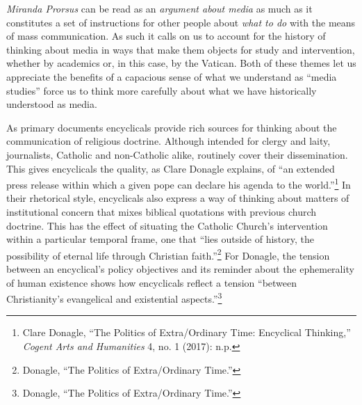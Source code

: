 \documentclass{tufte-handout}
\begin{document}
\noindent \emph{Miranda Prorsus} can be read as an
\emph{argument about media} as much as it constitutes a set of
instructions for other people about \emph{what to do} with the means of
mass communication. As such it calls on us to account for the history of
thinking about media in ways that make them objects for study and
intervention, whether by academics or, in this case, by the Vatican.
Both of these themes let us appreciate the benefits of a capacious sense
of what we understand as ``media studies'' force us to think more
carefully about what we have historically understood as media.

As primary documents encyclicals provide rich sources for thinking about
the communication of religious doctrine. Although intended for clergy
and laity, journalists, Catholic and non-Catholic alike, routinely cover
their dissemination. This gives encyclicals the quality, as Clare
Donagle explains, of ``an extended press release within which a given
pope can declare his agenda to the world.''\footnote{Clare Donagle,
  ``The Politics of Extra/Ordinary Time: Encyclical Thinking,''
  \emph{Cogent Arts and Humanities} 4, no. 1 (2017): n.p.} In their
rhetorical style, encyclicals also express a way of thinking about
matters of institutional concern that mixes biblical quotations with
previous church doctrine. This has the effect of situating the Catholic
Church's intervention within a particular temporal frame, one that
``lies outside of history, the possibility of eternal life through
Christian faith.''\footnote{Donagle, ``The Politics of Extra/Ordinary
  Time.''} For Donagle, the tension between an encyclical's policy
objectives and its reminder about the ephemerality of human existence
shows how encyclicals reflect a tension ``between Christianity's
evangelical and existential aspects.''\footnote{Donagle, ``The Politics
  of Extra/Ordinary Time.''}
\end{document}
